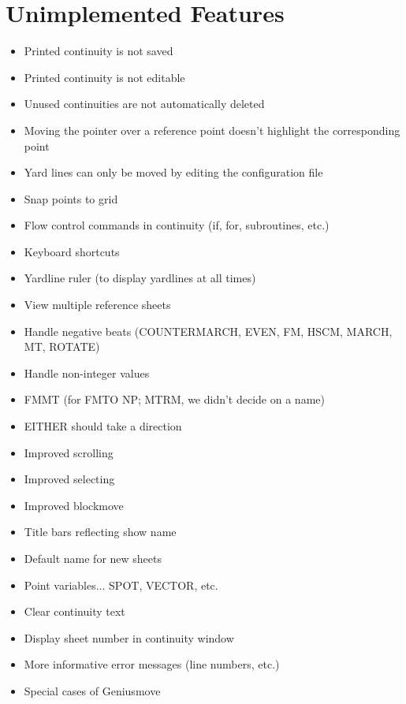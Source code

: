 \section{Unimplemented Features}\label{notdone}

\begin{itemize}\itemsep=0pt
\item Printed continuity is not saved
\item Printed continuity is not editable
\item Unused continuities are not automatically deleted
\item Moving the pointer over a reference point doesn't highlight the
corresponding point
\item Yard lines can only be moved by editing the configuration file
\item Snap points to grid
\item Flow control commands in continuity (if, for, subroutines, etc.)
\item Keyboard shortcuts
\item Yardline ruler (to display yardlines at all times)
\item View multiple reference sheets
\item Handle negative beats (COUNTERMARCH, EVEN, FM, HSCM, MARCH, MT, ROTATE)
\item Handle non-integer values
\item FMMT (for FMTO NP; MTRM, we didn't decide on a name)
\item EITHER should take a direction
\item Improved scrolling
\item Improved selecting
\item Improved blockmove
\item Title bars reflecting show name
\item Default name for new sheets
\item Point variables... SPOT, VECTOR, etc.
\item Clear continuity text
\item Display sheet number in continuity window
\item More informative error messages (line numbers, etc.)
\item Special cases of Geniusmove
\end{itemize}
